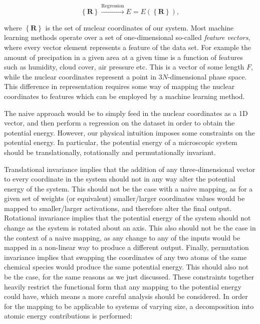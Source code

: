 \begin{equation}
 \left\{ \bm{R} \right\} \overset{\text{Regression}}{\longrightarrow}
    E = E\left( \left\{ \bm{R} \right\}\right) , 
\end{equation}

where $\left\{\bm{R}\right\}$ is the set of nuclear coordinates of our system.
Most machine learning methods operate over a set of one-dimensional
so-called \textit{feature vectors}, where every vector element
represents a feature of the data set. For example the amount
of precipation in a given area at a given time is a function
of features such as humidity, cloud cover, air pressure etc.
This is a vector of some length $F$, while the nuclear coordinates
represent a point in $3N$-dimensional phase space.
This difference in representation requires some way of mapping
the nuclear coordinates to features which can be employed
by a machine learning method.
\par
The naive approach would be to simply feed in the nuclear coordinates
as a 1D vector, and then perform a regression on the dataset
in order to obtain the potential energy. However, our physical intuition
imposes some constraints on the potential energy.
In particular, the potential energy of a microscopic system should
be translationally, rotationally and permutationally invariant.
\par
Translational invariance implies that the addition of any
three-dimensional vector to every coordinate in the system should
not in any way alter the potential energy of the system.
This should not be the case with a naive mapping, as for a given
set of weights (or equivalent) smaller/larger coordinates
values would be mapped to smaller/larger activations, and therefore
alter the final output.
Rotational invariance implies that the potential energy
of the system should not change as the system is rotated
about an axis. This also should not be the case in the context
of a naive mapping, as any change to any of the inputs
would be mapped in a non-linear way to produce a different output.
Finally, permutation invariance implies that swapping the coordinates
of any two atoms of the same chemical species would produce the
same potential energy. This should also not be the case, for
the same reasons as we just discussed.
These constraints together heavily restrict the functional form
that any mapping to the potential energy could have,
which means a more careful analysis should be considered.
\newline
\newline
In order for the mapping to be applicable to systems of varying size,
a decomposition into atomic energy contributions is performed:

